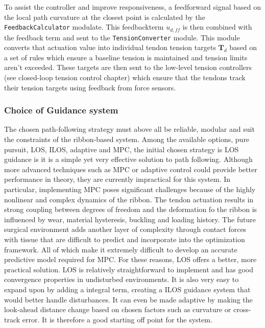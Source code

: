 \newline \newline
To assist the controller and improve responsiveness, a feedforward signal based on the local path curvature at the closest point is calculated by the \texttt{FeedbackCalculator} modulate. This feedbackterm \(u_{d, ff}\) is then combined with the feedback term and sent to the \texttt{TensionConverter} module. This module converts that actuation value into individual tendon tension targets \(\textbf{T}_d\) based on a set of rules which ensure a baseline tension is maintained and tension limits aren't exceeded. These targets are then sent to the low-level tension controllers (see closed-loop tension control chapter) which ensure that the tendons track their tension targets using feedback from force sensors.



\subsubsection{Choice of Guidance system}
The chosen path-following strategy must above all be reliable, modular and suit the constraints of the ribbon-based system. Among the available options, pure pursuit, LOS, ILOS, adaptive and MPC, the initial chosen strategy is LOS guidance is it is a simple yet very effective solution to path following.
\newline \newline 
Although more advanced techniques such as MPC or adaptive control could provide better performance in theory, they are currently impractical for this system. In particular, implementing MPC poses significant challenges because of the highly nonlinear and complex dynamics of the ribbon. The tendon actuation results in strong coupling between degrees of freedom and the deformation fo the ribbon is influenced by wear, material hysteresis, buckling and loading history. The future surgical environment adds another layer of complexity through contact forces with tissue that are difficult to predict and incorporate into the optimization framework. All of which make it extremely difficult to develop an accurate predictive model required for MPC.
\newline \newline
For these reasons, LOS offers a better, more practical solution. LOS is relatively straightforward to implement and has good convergence properties in undisturbed environments. It is also very easy to expand upon by adding a integral term, creating a ILOS guidance system that would better handle disturbances. It can even be made adaptive by making the look-ahead distance change based on chosen factors such as curvature or cross-track error. It is therefore a good starting off point for the system.

